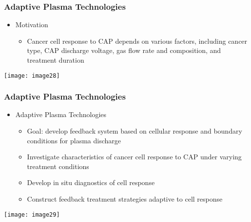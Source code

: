 \documentclass[hyperref={pdftex,pdfpagemode=none,pdfstartview=Fit}]{beamer}
\begin{document}
\begin{frame}
    \frametitle{Adaptive Plasma Technologies} 

    \begin{itemize}
        \item Motivation
            \begin{itemize}
                \item Cancer cell response to CAP depends on various factors, including cancer type, CAP discharge voltage, gas flow rate and composition, and treatment duration 
            \end{itemize}
    \end{itemize}

    \centerline{
        \texttt{[image: image28]}
    }
\end{frame}

\begin{frame}
    \frametitle{Adaptive Plasma Technologies} 

    \begin{itemize}
        \item Adaptive Plasma Technologies
            \begin{itemize}
                \item Goal: develop feedback system based on cellular response and boundary conditions for plasma discharge
                \item Investigate characteristics of cancer cell response to CAP under varying treatment conditions
                \item Develop in situ diagnostics of cell response
                \item Construct feedback treatment strategies adaptive to cell response
            \end{itemize}
    \end{itemize}
    \centerline{
        \texttt{[image: image29]}
    }
\end{frame}
\end{document}
